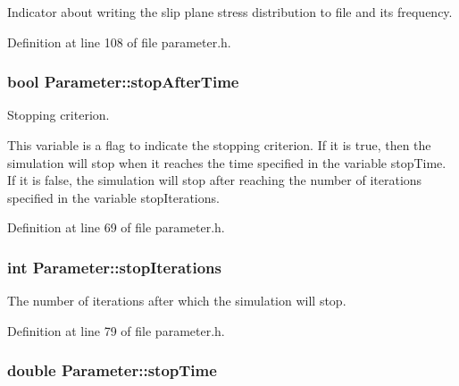 \-Indicator about writing the slip plane stress distribution to file and its frequency. 



\-Definition at line 108 of file parameter.\-h.

\hypertarget{classParameter_ae8af2b62df4db7df92e39a2c49a01c51}{
\subsubsection[{stop\-After\-Time}]{\setlength{\rightskip}{0pt plus 5cm}bool {\bf \-Parameter\-::stop\-After\-Time}}}\label{dc/dab/classParameter_ae8af2b62df4db7df92e39a2c49a01c51}


\-Stopping criterion. 

\-This variable is a flag to indicate the stopping criterion. \-If it is true, then the simulation will stop when it reaches the time specified in the variable stop\-Time. \-If it is false, the simulation will stop after reaching the number of iterations specified in the variable stop\-Iterations. 

\-Definition at line 69 of file parameter.\-h.

\hypertarget{classParameter_a41c818324af9b9b77902e68e9db79b2f}{
\subsubsection[{stop\-Iterations}]{\setlength{\rightskip}{0pt plus 5cm}int {\bf \-Parameter\-::stop\-Iterations}}}\label{dc/dab/classParameter_a41c818324af9b9b77902e68e9db79b2f}


\-The number of iterations after which the simulation will stop. 



\-Definition at line 79 of file parameter.\-h.

\hypertarget{classParameter_a2a91bde3ec5b05c0ea30035e1d3562d1}{
\subsubsection[{stop\-Time}]{\setlength{\rightskip}{0pt plus 5cm}double {\bf \-Parameter\-::stop\-Time}}}\label{dc/dab/classParameter_a2a91bde3ec5b05c0ea30035e1d3562d1}


